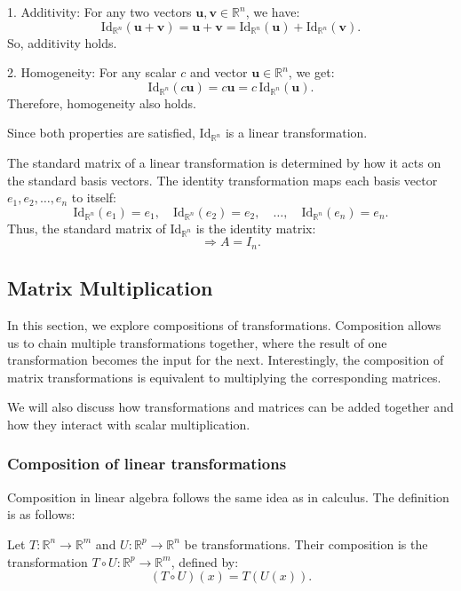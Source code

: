 \documentclass[a4paper,12pt]{article}
\begin{document}
1. Additivity: For any two vectors \( \mathbf{u}, \mathbf{v} \in \mathbb{R}^n \), we have:
   \[
   \text{Id}_{\mathbb{R}^n}(\mathbf{u} + \mathbf{v}) = \mathbf{u} + \mathbf{v} = \text{Id}_{\mathbb{R}^n}(\mathbf{u}) + \text{Id}_{\mathbb{R}^n}(\mathbf{v}).
   \]
   So, additivity holds.

2. Homogeneity: For any scalar \( c \) and vector \( \mathbf{u} \in \mathbb{R}^n \), we get:
   \[
   \text{Id}_{\mathbb{R}^n}(c \mathbf{u}) = c \mathbf{u} = c \, \text{Id}_{\mathbb{R}^n}(\mathbf{u}).
   \]
   Therefore, homogeneity also holds.

Since both properties are satisfied, \( \text{Id}_{\mathbb{R}^n} \) is a linear transformation.


The standard matrix of a linear transformation is determined by how it acts on the standard basis vectors. The identity transformation maps each basis vector \( e_1, e_2, \dots, e_n \) to itself:
\[
\text{Id}_{\mathbb{R}^n}(e_1) = e_1, \quad \text{Id}_{\mathbb{R}^n}(e_2) = e_2, \quad \dots, \quad \text{Id}_{\mathbb{R}^n}(e_n) = e_n.
\]
Thus, the standard matrix of \( \text{Id}_{\mathbb{R}^n} \) is the identity matrix:
\[
\Rightarrow A = I_n.
\]
\subsection{Matrix Multiplication}In this section, we explore compositions of transformations. Composition allows us to chain multiple transformations together, where the result of one transformation becomes the input for the next. Interestingly, the composition of matrix transformations is equivalent to multiplying the corresponding matrices.

We will also discuss how transformations and matrices can be added together and how they interact with scalar multiplication.
\subsubsection{Composition of linear transformations}Composition in linear algebra follows the same idea as in calculus. The definition is as follows:

\begin{tcolorbox}[title=Definition,colframe=blue!70!black, colback=blue!5!white]
Let \( T : \mathbb{R}^n \to \mathbb{R}^m \) and \( U : \mathbb{R}^p \to \mathbb{R}^n \) be transformations. Their composition is the transformation \( T \circ U : \mathbb{R}^p \to \mathbb{R}^m \), defined by:
\[
(T \circ U)(x) = T(U(x)).
\]
\end{tcolorbox}
\end{document}
